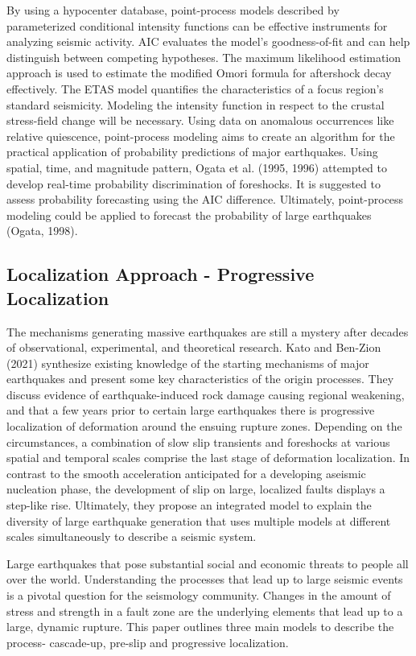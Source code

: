 \documentclass[12pt]{article} %
\theoremstyle{plain}
\begin{document}
	By using a hypocenter database, point-process models described by parameterized conditional intensity functions can be effective instruments for analyzing seismic activity. AIC evaluates the model's goodness-of-fit and can help distinguish between competing hypotheses. The maximum likelihood estimation approach is used to estimate the modified Omori formula for aftershock decay effectively. The ETAS model quantifies the characteristics of a focus region's standard seismicity. Modeling the intensity function in respect to the crustal stress-field change will be necessary. Using data on anomalous occurrences like relative quiescence, point-process modeling aims to create an algorithm for the practical application of probability predictions of major earthquakes. Using spatial, time, and magnitude pattern, Ogata et al. (1995, 1996) attempted to develop real-time probability discrimination of foreshocks. It is suggested to assess probability forecasting using the AIC difference. Ultimately, point-process modeling could be applied to forecast the probability of large earthquakes (Ogata, 1998).
	
	
	\subsection{Localization Approach - Progressive Localization}

	The mechanisms generating massive earthquakes are still a mystery after decades of observational, experimental, and theoretical research. Kato and Ben-Zion (2021) synthesize existing knowledge of the starting mechanisms of major earthquakes and present some key characteristics of the origin processes. They discuss evidence of earthquake-induced rock damage causing regional weakening, and that a few years prior to certain large earthquakes there is progressive localization of deformation around the ensuing rupture zones. Depending on the circumstances, a combination of slow slip transients and foreshocks at various spatial and temporal scales comprise the last stage of deformation localization. In contrast to the smooth acceleration anticipated for a developing aseismic nucleation phase, the development of slip on large, localized faults displays a step-like rise. Ultimately, they propose an integrated model to explain the diversity of large earthquake generation that uses multiple models at different scales simultaneously to describe a seismic system. 
	
	Large earthquakes that pose substantial social and economic threats to people all over the world. Understanding the processes that lead up to large seismic events is a pivotal question for the seismology community. Changes in the amount of stress and strength in a fault zone are the underlying elements that lead up to a large, dynamic rupture. This paper outlines three main models to describe the process- cascade-up, pre-slip and progressive localization. 
	
\end{document}
